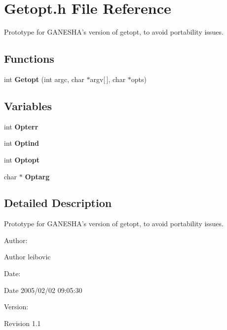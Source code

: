 \section{Getopt.h File Reference}
\label{Getopt_8h}
Prototype for GANESHA's version of getopt, to avoid portability issues. 

\subsection*{Functions}
\begin{CompactItemize}
\item 
int {\bf Getopt} (int argc, char $\ast$argv[$\,$], char $\ast$opts)
\end{CompactItemize}
\subsection*{Variables}
\begin{CompactItemize}
\item 
int {\bf Opterr}
\item 
int {\bf Optind}
\item 
int {\bf Optopt}
\item 
char $\ast$ {\bf Optarg}
\end{CompactItemize}


\subsection{Detailed Description}
Prototype for GANESHA's version of getopt, to avoid portability issues. 

\begin{Desc}
\item[Author:]\begin{Desc}
\item[Author]leibovic \end{Desc}
\end{Desc}
\begin{Desc}
\item[Date:]\begin{Desc}
\item[Date]2005/02/02 09:05:30 \end{Desc}
\end{Desc}
\begin{Desc}
\item[Version:]\begin{Desc}
\item[Revision]1.1 \end{Desc}
\end{Desc}


